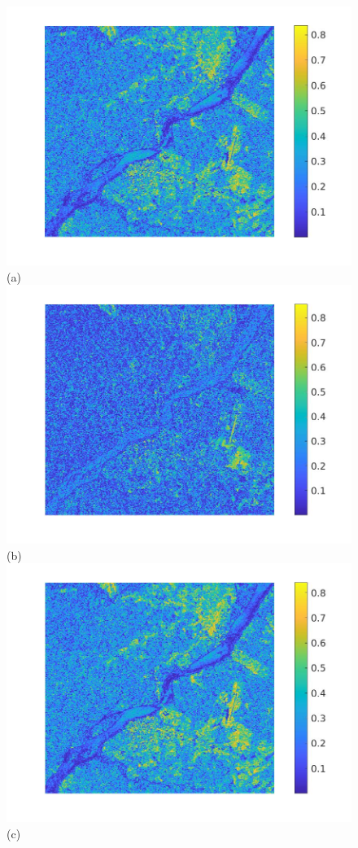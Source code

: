\documentclass[journal]{IEEEtran}
\begin{document}
\begin{figure}[htp!]
\includegraphics[scale=.12]{../../figs/J2_VV_image_cor}(a)
\includegraphics[scale=.12]{../../figs/J2_VH_image_cor}(b)\\
\includegraphics[scale=.12]{../../figs/J2_euclid_image_cor}(c)

\end{figure}
\end{document}
